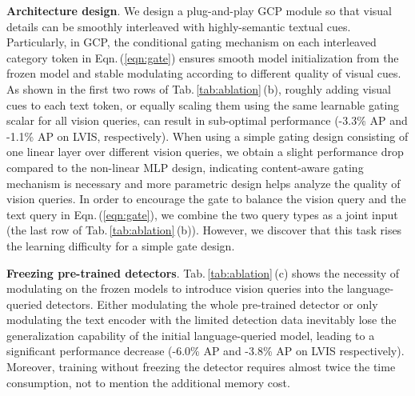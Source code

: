 \textbf{Architecture design}.
We design a plug-and-play GCP module so that visual details can be smoothly interleaved with highly-semantic textual cues. Particularly, in GCP, the conditional gating mechanism on each interleaved category token in Eqn.\,(\ref{eqn:gate}) ensures smooth model initialization from the frozen model and stable modulating according to different quality of visual cues. As shown in the first two rows of Tab.\,\ref{tab:ablation}\,(b), roughly adding visual cues to each text token, or equally scaling them using the same learnable gating scalar for all vision queries, can result in sub-optimal performance (-3.3\% AP and -1.1\% AP on LVIS, respectively). When using a simple gating design consisting of one linear layer over different vision queries, we obtain a slight performance drop compared to the non-linear MLP design, indicating content-aware gating mechanism is necessary and more parametric design helps analyze the quality of vision queries. In order to encourage the gate to balance the vision query  and the text query  in Eqn.\,(\ref{eqn:gate}), we combine the two query types as a joint input (the last row of Tab.\,\ref{tab:ablation}\,(b)). However, we discover that this task rises the learning difficulty for a simple gate design.


\textbf{Freezing pre-trained detectors}.
Tab.\,\ref{tab:ablation}\,(c) shows the necessity of modulating on the frozen models to introduce vision queries into the language-queried detectors.
Either modulating the whole pre-trained detector or only modulating the text encoder with the limited detection data inevitably lose the generalization capability of the initial language-queried model, leading to  a significant performance decrease (-6.0\% AP and  -3.8\% AP on LVIS respectively).
Moreover,  training without freezing the detector requires almost twice the time consumption, not to mention the additional memory cost.















































